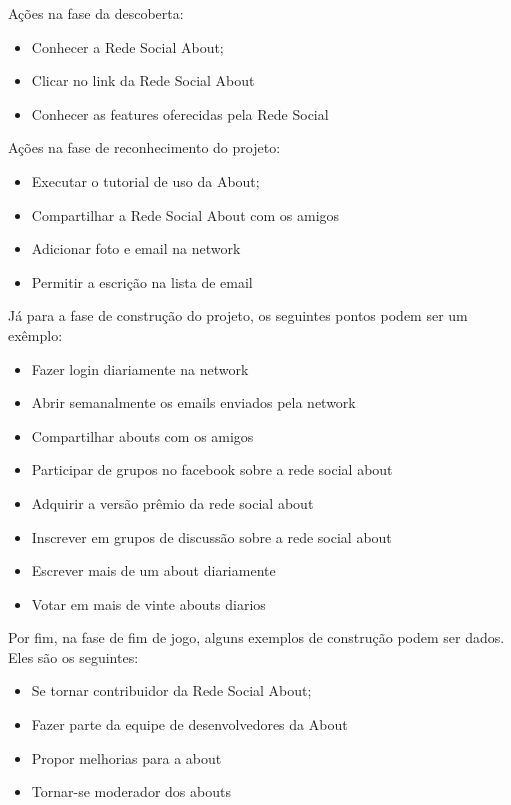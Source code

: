 Ações na fase da descoberta:
\begin{itemize}
    \item Conhecer a Rede Social About;
    \item Clicar no link da Rede Social About
    \item Conhecer as features oferecidas pela Rede Social
\end{itemize}


Ações na fase de reconhecimento do projeto:
\begin{itemize}
    \item Executar o tutorial de uso da About;
    \item Compartilhar a Rede Social About com os amigos
    \item Adicionar foto e email na network
    \item Permitir a escrição na lista de email
\end{itemize}

Já para a fase de construção do projeto, os seguintes pontos podem ser um
exêmplo:

\begin{itemize}
    \item Fazer login diariamente na network
    \item Abrir semanalmente os emails enviados pela network
    \item Compartilhar abouts com os amigos
    \item Participar de grupos no facebook sobre a rede social about
    \item Adquirir a versão prêmio da rede social about
    \item Inscrever em grupos de discussão sobre a rede social about
    \item Escrever mais de um about diariamente
    \item Votar em mais de vinte abouts diarios
\end{itemize}

Por fim, na fase de fim de jogo, alguns exemplos de construção podem ser dados.
Eles são os seguintes:
\begin{itemize}
    \item Se tornar contribuidor da Rede Social About;
    \item Fazer parte da equipe de desenvolvedores da About
    \item Propor melhorias para a about
    \item Tornar-se moderador dos abouts
\end{itemize}

